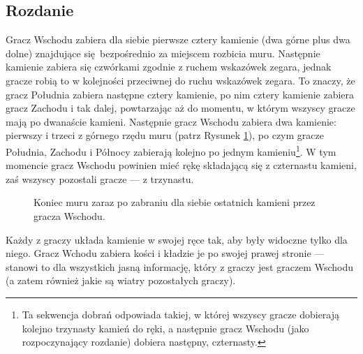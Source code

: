 \subsection{Rozdanie}
Gracz Wschodu zabiera dla siebie pierwsze cztery kamienie (dwa górne plus dwa
dolne) znajdujące się bezpośrednio za miejscem rozbicia muru.
Następnie kamienie zabiera się czwórkami zgodnie z ruchem wskazówek zegara,
jednak gracze robią to w kolejności przeciwnej do ruchu wskazówek zegara.
To znaczy, że gracz Południa zabiera następne cztery kamienie, po nim cztery
kamienie zabiera gracz Zachodu i tak dalej, powtarzając aż do momentu, w którym
wszyscy gracze mają po dwanaście kamieni.
Następnie gracz Wschodu zabiera dwa kamienie: pierwszy i trzeci z górnego rzędu
muru (patrz Rysunek \ref{fig:chinski-szpon}), po czym gracze Południa, Zachodu i
Północy zabierają kolejno po jednym kamieniu\footnote{
    Ta sekwencja dobrań odpowiada takiej, w której wszyscy gracze dobierają
    kolejno trzynasty kamień do ręki, a następnie gracz Wschodu (jako
    rozpoczynający rozdanie) dobiera następny, czternasty.
}.
W tym momencie gracz Wschodu powinien mieć rękę składającą się z czternastu
kamieni, zaś wszyscy pozostali gracze --- z trzynastu.
\begin{figure}[h]
    \centering
    
    \caption{Koniec muru zaraz po zabraniu dla siebie ostatnich kamieni przez gracza
    Wschodu.}
    \label{fig:chinski-szpon}
\end{figure}

Każdy z graczy układa kamienie w swojej ręce tak, aby były widoczne tylko dla
niego.
Gracz Wchodu zabiera kości i kładzie je po swojej prawej stronie --- stanowi to
dla wszystkich jasną informację, który z graczy jest graczem Wschodu (a zatem
również jakie są wiatry pozostałych graczy).